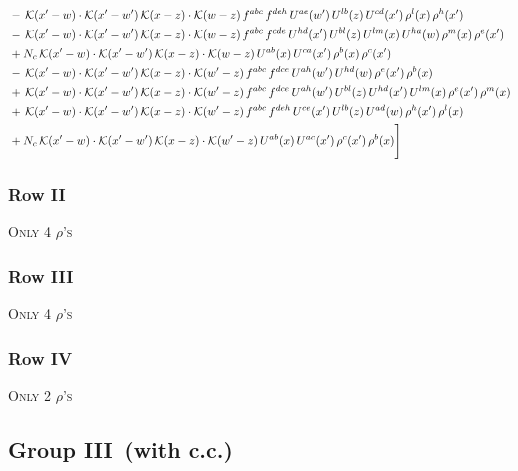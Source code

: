 \documentclass[9pt]{article}
\numberwithin{equation}{section}
\begin{document}
\begin{align}
& -\,\mathcal{K}(x'-w)\cdot\mathcal{K}(x'-w')\,\mathcal{K}(x-z)\cdot\mathcal{K}(w-z)\,f^{abc}\,f^{deh}\,U^{ae}(w')\,U^{lb}(z)\,U^{cd}(x')\,\rho^{l}(x)\,\rho^{h}(x')\notag\\
& -\,\mathcal{K}(x'-w)\cdot\mathcal{K}(x'-w')\,\mathcal{K}(x-z)\cdot\mathcal{K}(w-z)\,f^{abc}\,f^{cde}\,U^{hd}(x')\,U^{bl}(z)\,U^{lm}(x)\,U^{ha}(w)\,\rho^{m}(x)\,\rho^{e}(x')\notag\\
& +N_{c}\,\mathcal{K}(x'-w)\cdot\mathcal{K}(x'-w')\,\mathcal{K}(x-z)\cdot\mathcal{K}(w-z)\,U^{ab}(x)\,U^{ca}(x')\,\rho^{b}(x)\,\rho^{c}(x')\notag\\
& -\,\mathcal{K}(x'-w)\cdot\mathcal{K}(x'-w')\,\mathcal{K}(x-z)\cdot\mathcal{K}(w'-z)\,f^{abc}\,f^{dce}\,U^{ah}(w')\,U^{hd}(w)\,\rho^{e}(x')\,\rho^{b}(x)\notag\\
& +\,\mathcal{K}(x'-w)\cdot\mathcal{K}(x'-w')\,\mathcal{K}(x-z)\cdot\mathcal{K}(w'-z)\,f^{abc}\,f^{dce}\,U^{ah}(w')\,U^{bl}(z)\,U^{hd}(x')\,U^{lm}(x)\,\rho^{e}(x')\,\rho^{m}(x)\notag\\
& +\,\mathcal{K}(x'-w)\cdot\mathcal{K}(x'-w')\,\mathcal{K}(x-z)\cdot\mathcal{K}(w'-z)\,f^{abc}\,f^{deh}\,U^{ce}(x')\,U^{lb}(z)\,U^{ad}(w)\,\rho^{h}(x')\,\rho^{l}(x)\notag\\
& +N_{c}\,\mathcal{K}(x'-w)\cdot\mathcal{K}(x'-w')\,\mathcal{K}(x-z)\cdot\mathcal{K}(w'-z)\,U^{ab}(x)\,U^{ac}(x')\,\rho^{c}(x')\,\rho^{b}(x)\Bigg]
\end{align}
\subsubsection{Row II}
\textsc{Only 4 $\rho$'s}
\subsubsection{Row III}
\textsc{Only 4 $\rho$'s}
\subsubsection{Row IV}
\textsc{Only 2 $\rho$'s}
\subsection{Group III\, (with c.c.)}
\end{document}
